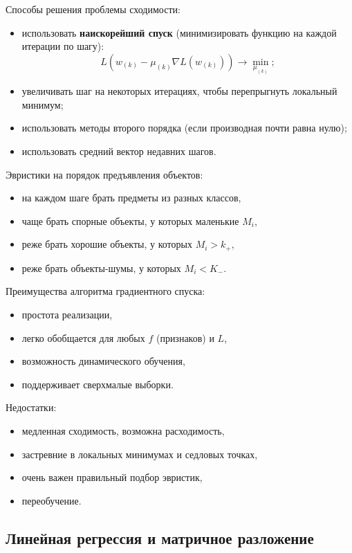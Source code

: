 Способы решения проблемы сходимости:
\begin{itemize}
    \item использовать \textbf{наискорейший спуск} (минимизировать функцию на
        каждой итерации по шагу):
    \[
        L(w_{(k)} - \mu_{(k)}\nabla L(w_{(k)})) \to \min_{\mu_{(k)}};
    \]

    \item  увеличивать шаг на некоторых итерациях, чтобы перепрыгнуть локальный
        минимум;

    \item использовать методы второго порядка (если производная почти равна
        нулю);

    \item использовать средний вектор недавних шагов.
\end{itemize}

Эвристики на порядок предъявления объектов:
\begin{itemize}
    \item на каждом шаге брать предметы из разных классов,
    \item чаще брать спорные объекты, у которых маленькие $M_i$,
    \item реже брать хорошие объекты, у которых $M_i > k_+$,
    \item реже брать объекты-шумы, у которых $M_i < K_-$.
\end{itemize}

Преимущества алгоритма градиентного спуска:
\begin{itemize}
    \item простота реализации,
    \item легко обобщается для любых $f$ (признаков) и $L$,
    \item возможность динамического обучения,
    \item поддерживает сверхмалые выборки.
\end{itemize}

Недостатки:
\begin{itemize}
    \item медленная сходимость, возможна расходимость,
    \item застревние в локальных минимумах и седловых точках,
    \item очень важен правильный подбор эвристик,
    \item переобучение.
\end{itemize}

\subsection{Линейная регрессия и матричное разложение}

